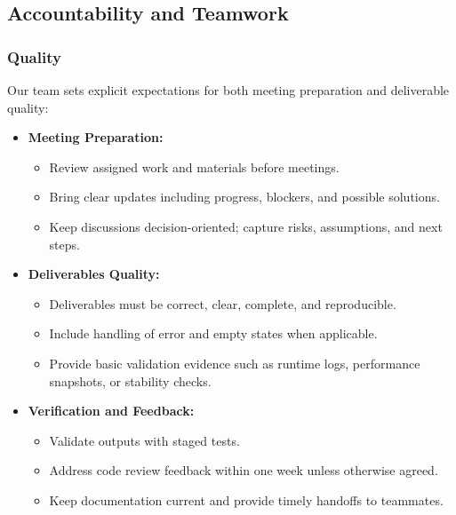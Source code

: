 \documentclass{article}
\begin{document}
\subsection*{Accountability and Teamwork}

\subsubsection*{Quality} 

Our team sets explicit expectations for both meeting preparation and deliverable quality:
\begin{itemize}
  \item \textbf{Meeting Preparation:}
    \begin{itemize}
      \item Review assigned work and materials before meetings.
      \item Bring clear updates including progress, blockers, and possible solutions.
      \item Keep discussions decision-oriented; capture risks, assumptions, and next steps.
    \end{itemize}

  \item \textbf{Deliverables Quality:}
    \begin{itemize}
      \item Deliverables must be correct, clear, complete, and reproducible.
      \item Include handling of error and empty states when applicable.
      \item Provide basic validation evidence such as runtime logs, performance snapshots, or stability checks.
    \end{itemize}

  \item \textbf{Verification and Feedback:}
    \begin{itemize}
      \item Validate outputs with staged tests.
      \item Address code review feedback within one week unless otherwise agreed.
      \item Keep documentation current and provide timely handoffs to teammates.
    \end{itemize}
\end{itemize}
\end{document}

